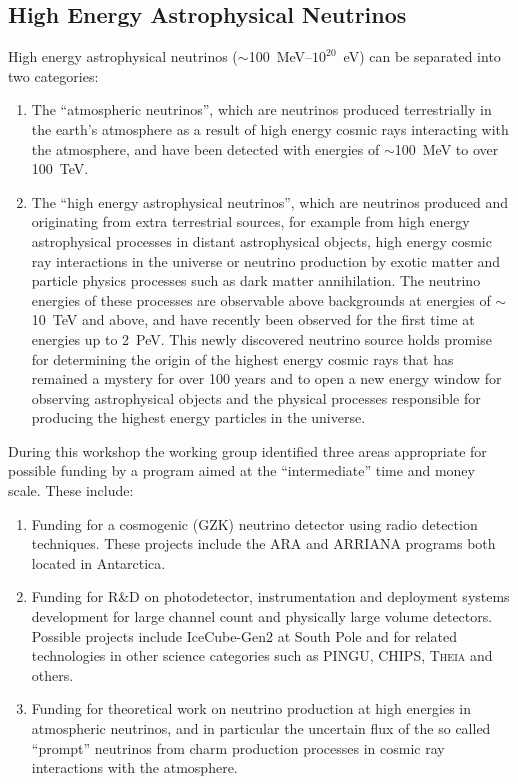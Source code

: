 \subsection{High Energy Astrophysical Neutrinos}
\label{sec:Astrophysical_high}

High energy astrophysical neutrinos ($\sim$100~MeV--$10^{20}$~eV) can be
separated into two categories: 
\begin{enumerate}
  \item The ``atmospheric neutrinos'', which are neutrinos produced terrestrially in the earth's
atmosphere as a result of high energy cosmic rays interacting with the
atmosphere, and have been detected with energies of $\sim$100~MeV to over
100~TeV. 
   \item The ``high energy astrophysical neutrinos'', which are
neutrinos produced and originating from extra terrestrial sources, for
example from high energy astrophysical processes in distant
astrophysical objects, high energy cosmic ray interactions in the
universe or neutrino production by exotic matter and particle physics
processes such as dark matter annihilation. The neutrino energies of
these processes are observable above backgrounds at energies of
$\sim$10~TeV and above, and have recently been observed for the first
time at energies up to 2~PeV. This newly discovered neutrino source
holds promise for determining the origin of the highest energy cosmic
rays that has remained a mystery for over 100 years and to open a new
energy window for observing astrophysical objects and the physical
processes responsible for producing the highest energy particles in
the universe.
\end{enumerate}

During this workshop the working group identified three areas
appropriate for possible funding by a program aimed at the
``intermediate'' time and money scale. These include: 
\begin{enumerate}
  \item Funding for a cosmogenic (GZK) neutrino detector using radio detection
techniques. These projects include the ARA and ARRIANA programs both
located in Antarctica.
  \item Funding for R\&D on photodetector,
instrumentation and deployment systems development for large channel
count and physically large volume detectors. Possible projects include
IceCube-Gen2 at South Pole and for related technologies in other
science categories such as PINGU, CHIPS, \textsc{Theia} and others. 
  \item Funding for theoretical work on neutrino production at high energies in
atmospheric neutrinos, and in particular the uncertain flux of the so
called ``prompt'' neutrinos from charm production processes in
cosmic ray interactions with the atmosphere.
\end{enumerate}



